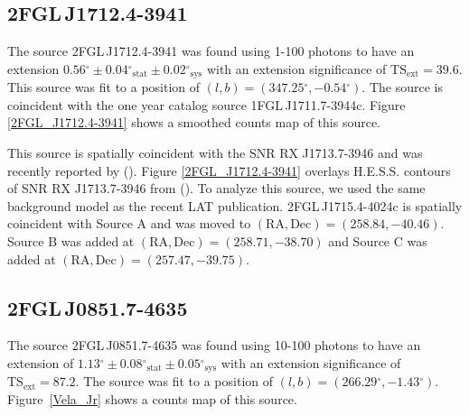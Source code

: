 \documentclass[12pt,preprint]{aastex}
\newcommand{\gev}{\text{GeV}\xspace}
\newcommand{\tev}{\text{TeV}\xspace}
\newcommand{\tsext}{{\ensuremath{\text{TS}_{\text{ext}}}}\xspace}
\newcommand{\sys}{\text{sys}\xspace}
\newcommand{\stat}{\text{stat}\xspace}
\renewcommand{\deg}{\ensuremath{^\circ}\xspace}
\begin{document}
\subsection{2FGL\,J1712.4-3941}
\label{section_2FGL_J1712.4-3941}


The source 2FGL\,J1712.4-3941 was found using 1-100 \gev
photons to have an extension $0.56\deg\pm0.04\deg_\stat\pm0.02\deg_\sys$
with an extension significance of $\tsext=39.6$.  This source was
fit to a position of $(l,b)=(347.25\deg,-0.54\deg)$.  The source
is coincident with the one year catalog source 1FGL\,J1711.7-3944c.
Figure \ref{2FGL_J1712.4-3941} shows a smoothed counts map of this source.

This source is spatially coincident with the SNR RX J1713.7-3946
and was recently reported by (\cite{rx_j1713_lat}).  Figure
\ref{2FGL_J1712.4-3941} overlays H.E.S.S. \tev contours of SNR RX
J1713.7-3946 from (\cite{rx_j1713_hess}).  To analyze this source,
we used the same background model as the recent LAT publication.
2FGL\,J1715.4-4024c is spatially coincident with Source A and was
moved to $(\text{RA},\text{Dec})=(258.84,-40.46)$. Source B was added
at $(\text{RA},\text{Dec})=(258.71,-38.70)$ and Source C was added at
$(\text{RA},\text{Dec})=(257.47,-39.75)$.

\subsection{2FGL\,J0851.7-4635}
\label{section_2FGL_J0851.7-4635}


The source 2FGL\,J0851.7-4635 was found 
using 10-100 \gev photons to have an
extension of $1.13\deg\pm0.08\deg_\stat\pm0.05\deg_\sys$ 
with an extension
significance of $\tsext=87.2$.  The source was fit to a position of
$(l,b)=(266.29\deg,-1.43\deg)$.  Figure~\ref{Vela_Jr} shows a counts
map of this source.
\end{document}
